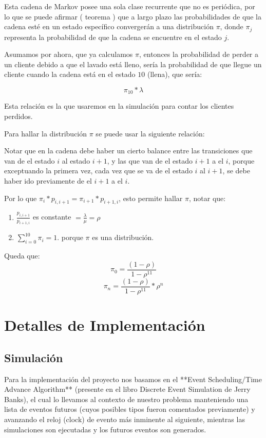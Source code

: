 \documentclass[14pt]{extarticle}
\begin{document}
Esta cadena de Markov posee una sola clase recurrente que no es periódica, por lo que se puede afirmar ( teorema ) que a largo plazo las probabilidades de que la cadena esté en un estado específico convergerán a una distribución $\pi$, donde $\pi_j$ representa la probabilidad de que la cadena se encuentre en el estado $j$. 

Asumamos por ahora, que ya calculamos $\pi$, entonces la probabilidad de perder a un cliente debido a que el lavado está lleno, sería la probabilidad de que llegue un cliente cuando la cadena está en el estado $10$ (llena), que sería:

$$\pi_{10} * \lambda $$

Esta relación es la que usaremos en la simulación para contar los clientes perdidos.

Para hallar la distribución $\pi$ se puede usar la siguiente relación:

Notar que en la cadena debe haber un cierto balance entre las transiciones que van de el estado $i$ al estado $i+1$, y las que van de el estado $i+1$ a el $i$, porque exceptuando la primera vez, cada vez que se va de el estado $i$ al $i+1$, se debe haber ido previamente de el $i+1$ a el $i$.

Por lo que $\pi_i * p_{i, i+1} = \pi_{i+1} * p_{i+1, i}$, esto permite hallar $\pi$, notar que:

\begin{enumerate}
    \item $\frac{p_{i, i+1}}{p_{i+1, i}}$ es constante $= \frac{ \lambda}{ \mu}  = \rho$
    \item $\sum_{i = 0}^{10} \pi_i = 1$. porque $\pi$ es una distribución.
\end{enumerate}

Queda que: 
	$$\pi_0 = \frac{(1 - \rho)}{1 - \rho^{11}}$$
	$$\pi_n = \frac{(1 - \rho)} { 1 - \rho^{11}} * \rho^n$$

\section{Detalles de Implementación}

\subsection{Simulación}

Para la implementación del proyecto nos basamos en el **Event Scheduling/Time Advance Algorithm** (presente en el libro Discrete Event Simulation de Jerry Banks), el cual lo llevamos al contexto de nuestro problema manteniendo una lista de eventos futuros (cuyos posibles tipos fueron comentados previamente) y avanzando el reloj (clock) de evento más inminente al siguiente, mientras las simulaciones son ejecutadas y los futuros eventos son generados.
\end{document}
